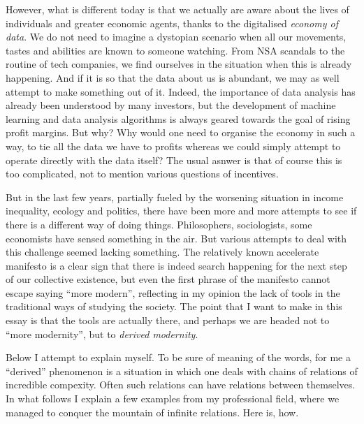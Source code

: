 \documentclass{article}
\begin{document}
However, what is different today is that we actually are aware about the lives of individuals and
greater economic agents, thanks to the digitalised \emph{economy of data}. We do not need to imagine
a dystopian scenario when all our movements, tastes and abilities are known to someone watching. From
NSA scandals to the routine of tech companies, we find ourselves in the situation when this is already
happening. And if it is so that the data about us is abundant, we may as well attempt to make something
out of it. Indeed, the importance of data analysis has already
been understood by many investors, but the development of machine learning and data analysis algorithms
is always geared towards the goal of rising profit margins. But why? Why would one need to
organise the economy in such a way, to tie all the data we have to profits whereas we
could simply attempt to operate directly with the data itself? The usual asnwer is that
of course this is too complicated, not to mention various questions of incentives.

But in the last few years, partially fueled by the worsening situation in income inequality, ecology and politics,
there have been more and more attempts to see if there is a different way of doing things.
Philosophers, sociologists, some economists have sensed something in the air.
But various attempts to deal with this challenge seemed lacking something. The relatively known accelerate manifesto \cite{SRNICEK} is a clear sign that there is indeed search happening for the next step of our collective existence, but even the first phrase of the manifesto cannot escape saying “more modern”, reflecting in my opinion the lack of tools in the traditional ways of studying the society. The point that I want to make in this essay is that the tools are actually there, and perhaps we are headed not to ``more modernity'', but to \emph{derived modernity}.

Below I attempt to explain myself. To be sure of meaning of the words, for me a ``derived'' phenomenon is
a situation in which one deals with chains of relations of incredible compexity. Often such
relations can have relations between themselves. In what follows I explain a few examples from my
professional field, where we managed to conquer the mountain of infinite relations.
Here is, how.
\end{document}
